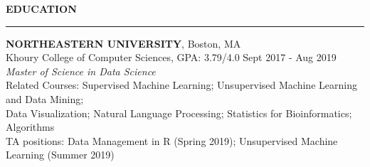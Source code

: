 \documentclass[a4paper]{article}
\newcommand{\myline}{\par
  \kern2pt %
  \hrule height 0.5pt
  \kern2pt %
}
\newcommand{\mybullet}{
	\indent 
  \textbullet \hspace*{2mm}
}
\begin{document}

	\noindent
	{\large \textbf{EDUCATION}}
	\myline 
	\smallskip
	
	\noindent
	\textbf{NORTHEASTERN UNIVERSITY}, Boston, MA \\
	Khoury College of Computer Sciences, GPA: 3.79/4.0 
        \hfill Sept 2017 - Aug 2019 \\
	\textit{Master of Science in Data Science} \\
        Related Courses: Supervised Machine Learning; 
        Unsupervised Machine Learning and Data Mining; \\
        \hspace*{23.9mm} Data Visualization;
        Natural Language Processing;
        Statistics for Bioinformatics; Algorithms \\
  TA positions: Data Management in R (Spring 2019); Unsupervised Machine Learning (Summer 2019) \\
\end{document}
